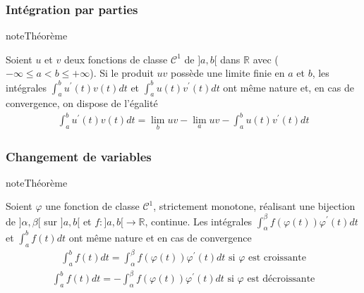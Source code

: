 \documentclass[letterpaper,10pt,french]{sphinxmanual}
\begin{document}
\subsubsection{Intégration par parties}
\label{\detokenize{def:integration-par-parties}}
\begin{sphinxadmonition}{note}{Théorème}

\sphinxAtStartPar
Soient \(u\) et \(v\) deux fonctions de classe \(\mathcal C^1\) de \(]a, b[\) dans \(\mathbb R\) avec (\(-\infty \leq a < b \leq +\infty\)). Si le produit \(uv\) possède une limite finie en \(a\) et \(b\), les intégrales \(\int_a^b u^{'}(t)v(t)dt\) et \(\int_a^b u(t)v^{'}(t)dt\) ont même nature et, en cas de convergence, on dispose de l’égalité
\begin{equation*}
\begin{split}
\int_a^b u^{'}(t)v(t)dt= \lim_{b} uv - \lim_{a} uv - \int_a^b u(t)v^{'}(t)dt
\end{split}
\end{equation*}\end{sphinxadmonition}


\subsubsection{Changement de variables}
\label{\detokenize{def:changement-de-variables}}
\begin{sphinxadmonition}{note}{Théorème}

\sphinxAtStartPar
Soient \(\varphi\) une fonction de classe \(\mathcal C^1\), strictement monotone, réalisant une bijection de \(]\alpha, \beta[\) sur \(]a, b[\) et \(f : ]a, b[ \to \mathbb R\), continue. Les intégrales \(\int_\alpha^\beta f(\varphi(t))\varphi^{'}(t)dt\) et \(\int_a^b f(t)dt\) ont même nature et en cas de convergence
\begin{equation*}
\begin{split}
\int_a^b f(t)dt = \int_\alpha^\beta f(\varphi(t))\varphi^{'}(t)dt \mbox{ si } \varphi \mbox{ est croissante}
\end{split}
\end{equation*}\begin{equation*}
\begin{split}
\int_a^b f(t)dt = - \int_\alpha^\beta f(\varphi(t))\varphi^{'}(t)dt \mbox{ si } \varphi \mbox{ est décroissante}
\end{split}
\end{equation*}\end{sphinxadmonition}
\end{document}
